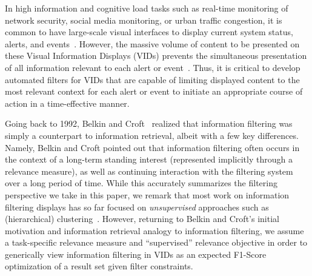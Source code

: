 In high information and cognitive load tasks such as real-time monitoring of network security, social media monitoring, or urban traffic congestion, it is common to have large-scale visual interfaces to display current system status, alerts, and events~\cite{Landesberger2011,Liu2014,Sun2013}. However, the massive volume of content to be presented on these Visual Information Displays (VIDs) prevents the simultaneous presentation of all information relevant to each alert or event~\cite{Liu2014}. Thus, it is critical to develop automated filters for VIDs that are capable of limiting displayed content to the most relevant context for each alert or event to initiate an appropriate course of action in a time-effective manner.  

Going back to 1992, Belkin and Croft~\citep{Belkin1992} realized that information filtering was simply a counterpart to information retrieval, albeit with a few key differences.  Namely, Belkin and Croft pointed out that 
information filtering often occurs in the context of a long-term standing interest (represented implicitly through a relevance measure), as well as continuing interaction with the filtering system over a long period of time.  
While this accurately summarizes the filtering perspective we take in this paper, we remark that most work on information filtering displays has so far focused on \emph{unsupervised} approaches such as (hierarchical) clustering~\cite{Ahlberg1995,Liu2014,Sankaranarayanan2009,Teitler2008,Bennamane2012,Shneiderman2013,Yifan2015,Smith2009}.  However, returning to Belkin and Croft's initial motivation and information retrieval analogy to information filtering, we assume a task-specific relevance measure and ``supervised'' relevance objective in order to generically view information filtering in VIDs as an expected F1-Score optimization of a result set given filter constraints.





